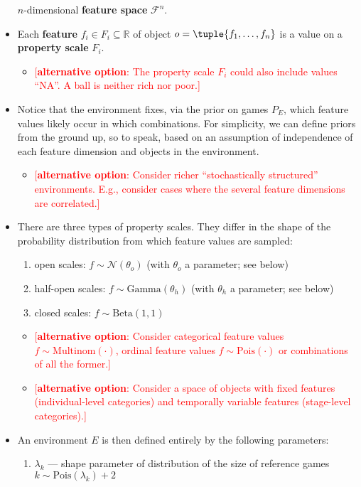 \documentclass[fleqn,reqno,12pt]{article}
\newcommand{\optional}[1]{\textcolor{Red}{[\textbf{alternative option}: #1]}}
\begin{document}
\begin{itemize}
  $n$-dimensional \textbf{feature space} $\mathcal{F}^n$.
\item Each \textbf{feature} $f_i \in F_i \subseteq \mathbb{R}$ of object
  $o = \tuple{f_1, \dots, f_n}$ is a value on a \textbf{property scale} $F_i$.
  \begin{itemize}
  \item \optional{The property scale $F_i$ could also include values ``NA''. A ball is
    neither rich nor poor.}
  \end{itemize}
\item Notice that the environment fixes, via the prior on games $P_E$, which feature values
    likely occur in which combinations. For simplicity, we can define priors from the ground
    up, so to speak, based on an assumption of independence of each feature dimension and
    objects in the environment. 
    \begin{itemize}
    \item \optional{Consider richer ``stochastically structured'' environments. E.g., consider
        cases where the several feature dimensions are correlated.}
    \end{itemize}
\item There are three types of property scales. They differ in the shape of the probability
  distribution from which feature values are sampled:
  \begin{enumerate}
  \item open scales: $f \sim \mathcal{N}(\theta_o)$ (with $\theta_o$ a parameter; see below)
  \item half-open scales: $f \sim \text{Gamma}(\theta_h)$ (with $\theta_h$ a parameter; see below)
  \item closed scales: $f \sim \text{Beta}(1,1)$
  \end{enumerate}
  \begin{itemize}
  \item \optional{Consider categorical feature values $f \sim \text{Multinom}(\cdot)$,
      ordinal feature values $f \sim \text{Pois}(\cdot)$ or combinations of all the former.}
  \item \optional{Consider a space of objects with fixed features (individual-level categories)
    and temporally variable features (stage-level categories).}
  \end{itemize}
\item An environment $E$ is then defined entirely by the following parameters:
  \begin{enumerate}
  \item $\lambda_k$ --- shape parameter of distribution of the size of reference games $k \sim \text{Pois}(\lambda_k) + 2$

\end{enumerate}
\end{itemize}
\end{document}
